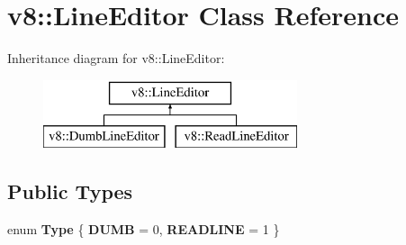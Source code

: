 \hypertarget{classv8_1_1_line_editor}{}\section{v8\+:\+:Line\+Editor Class Reference}
\label{classv8_1_1_line_editor}
Inheritance diagram for v8\+:\+:Line\+Editor\+:\begin{figure}[H]
\begin{center}
\leavevmode
\includegraphics[height=2.000000cm]{classv8_1_1_line_editor}
\end{center}
\end{figure}
\subsection*{Public Types}
\begin{DoxyCompactItemize}
\item 
\hypertarget{classv8_1_1_line_editor_a5ad6bd9c49106e685d1aaec9c89a3e17}{}enum {\bfseries Type} \{ {\bfseries D\+U\+M\+B} = 0, 
{\bfseries R\+E\+A\+D\+L\+I\+N\+E} = 1
 \}\label{classv8_1_1_line_editor_a5ad6bd9c49106e685d1aaec9c89a3e17}

\end{DoxyCompactItemize}
